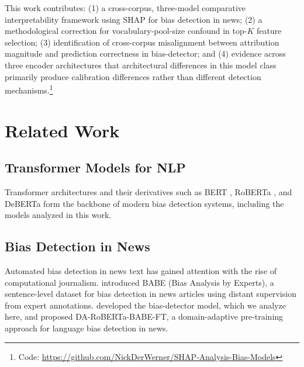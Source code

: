 \documentclass[11pt]{article}
\begin{document}
This work contributes: (1) a cross-corpus, three-model comparative 
interpretability framework using SHAP for bias detection in news; 
(2) a methodological correction for vocabulary-pool-size confound in 
top-$K$ feature selection; (3) identification of cross-corpus 
misalignment between attribution magnitude and prediction correctness 
in bias-detector; and (4) evidence across three encoder architectures 
that architectural differences in this model class primarily produce 
calibration differences rather than different detection mechanisms.\footnote{Code: \url{https://github.com/NickDerWerner/SHAP-Analysis-Bias-Models}}




\section{Related Work}
\subsection{Transformer Models for NLP}
Transformer architectures \cite{vaswani} and their derivatives such 
as BERT \cite{devlin-etal-2019-bert}, RoBERTa 
\cite{liu2019robertarobustlyoptimizedbert}, and DeBERTa 
\cite{he2021deberta} form the backbone of modern bias detection 
systems, including the models analyzed in this work.

\subsection{Bias Detection in News}
Automated bias detection in news text has gained attention with the 
rise of computational journalism. \citet{spinde2021babe} introduced 
BABE (Bias Analysis by Experts), a sentence-level dataset for bias 
detection in news articles using distant supervision from expert 
annotations. \citet{ghosh2025} developed the bias-detector model, 
which we analyze here, and \citet{Krieger2022} proposed DA-RoBERTa-BABE-FT, 
a domain-adaptive pre-training approach for language bias detection 
in news.

\end{document}
